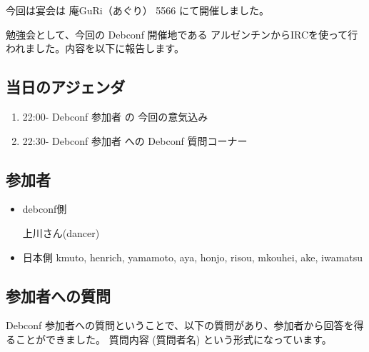 \documentclass[mingoth,a4paper]{jsarticle}
\begin{document}
今回は宴会は 庵GuRi（あぐり） 5566 にて開催しました。 


\label{sec:debconf8}

勉強会として、今回の Debconf 開催地である アルゼンチンからIRCを使って行われました。内容を以下に報告します。

\subsection{当日のアジェンダ}
\begin{enumerate}
\item 22:00-  Debconf 参加者 の 今回の意気込み
\item 22:30-  Debconf 参加者 への Debconf 質問コーナー
\end{enumerate}

\subsection{参加者}
\begin{itemize}
\item debconf側

 上川さん(dancer)

\item 日本側
kmuto, henrich, yamamoto, aya, honjo, risou, mkouhei, ake, iwamatsu
\end{itemize}

\subsection{参加者への質問}
Debconf 参加者への質問ということで、以下の質問があり、参加者から回答を得ることができました。
質問内容 (質問者名) という形式になっています。
\end{document}
